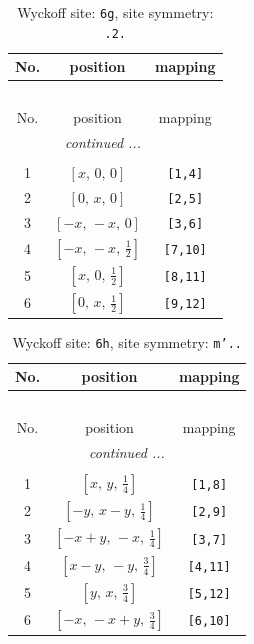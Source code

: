 \documentclass[fleqn,8pt]{jsarticle}
\begin{document}
\renewcommand{\arraystretch}{1.2}
\begin{longtable}{ccc}
\caption{Wyckoff site: {\tt 6g}, site symmetry: {\tt .2.}}
 \\
 \hline \hline
No. & position & mapping \\ \hline \endfirsthead

\multicolumn{2}{l}{\tablename\ \thetable{}} \\
 \hline \hline
No. & position & mapping \\ \hline \endhead

 \hline \hline
\multicolumn{2}{r}{\footnotesize\it continued ...} \\ \endfoot

 \hline \hline
\multicolumn{2}{r}{} \\ \endlastfoot

1 & $\left[ x,\, 0,\, 0 \right]$ & {\tt [1,4]} \\ \hline
2 & $\left[ 0,\, x,\, 0 \right]$ & {\tt [2,5]} \\ \hline
3 & $\left[ - x,\, - x,\, 0 \right]$ & {\tt [3,6]} \\ \hline
4 & $\left[ - x,\, - x,\, \frac{1}{2} \right]$ & {\tt [7,10]} \\ \hline
5 & $\left[ x,\, 0,\, \frac{1}{2} \right]$ & {\tt [8,11]} \\ \hline
6 & $\left[ 0,\, x,\, \frac{1}{2} \right]$ & {\tt [9,12]} \\
\end{longtable}
\renewcommand{\arraystretch}{1.2}
\begin{longtable}{ccc}
\caption{Wyckoff site: {\tt 6h}, site symmetry: {\tt m'..}}
 \\
 \hline \hline
No. & position & mapping \\ \hline \endfirsthead

\multicolumn{2}{l}{\tablename\ \thetable{}} \\
 \hline \hline
No. & position & mapping \\ \hline \endhead

 \hline \hline
\multicolumn{2}{r}{\footnotesize\it continued ...} \\ \endfoot

 \hline \hline
\multicolumn{2}{r}{} \\ \endlastfoot

1 & $\left[ x,\, y,\, \frac{1}{4} \right]$ & {\tt [1,8]} \\ \hline
2 & $\left[ - y,\, x - y,\, \frac{1}{4} \right]$ & {\tt [2,9]} \\ \hline
3 & $\left[ - x + y,\, - x,\, \frac{1}{4} \right]$ & {\tt [3,7]} \\ \hline
4 & $\left[ x - y,\, - y,\, \frac{3}{4} \right]$ & {\tt [4,11]} \\ \hline
5 & $\left[ y,\, x,\, \frac{3}{4} \right]$ & {\tt [5,12]} \\ \hline
6 & $\left[ - x,\, - x + y,\, \frac{3}{4} \right]$ & {\tt [6,10]} \\
\end{longtable}
\end{document}
